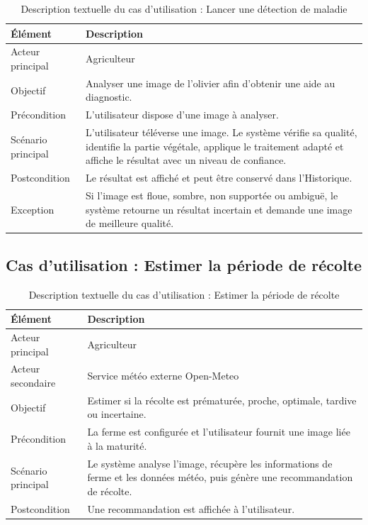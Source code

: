 \documentclass[12pt,a4paper]{report}
\begin{document}
\begin{table}[H]
\centering
\caption{Description textuelle du cas d'utilisation : Lancer une détection de maladie}
\label{tab:cu-detection-maladie}
\begin{tabular}{|p{4cm}|p{10cm}|}
\hline
\textbf{Élément} & \textbf{Description} \\
\hline
Acteur principal & Agriculteur \\
\hline
Objectif & Analyser une image de l'olivier afin d'obtenir une aide au diagnostic. \\
\hline
Précondition & L'utilisateur dispose d'une image à analyser. \\
\hline
Scénario principal & L'utilisateur téléverse une image. Le système vérifie sa qualité, identifie la partie végétale, applique le traitement adapté et affiche le résultat avec un niveau de confiance. \\
\hline
Postcondition & Le résultat est affiché et peut être conservé dans l'Historique. \\
\hline
Exception & Si l'image est floue, sombre, non supportée ou ambiguë, le système retourne un résultat incertain et demande une image de meilleure qualité. \\
\hline
\end{tabular}
\end{table}

\subsection{Cas d'utilisation : Estimer la période de récolte}

\begin{table}[H]
\centering
\caption{Description textuelle du cas d'utilisation : Estimer la période de récolte}
\label{tab:cu-recolte}
\begin{tabular}{|p{4cm}|p{10cm}|}
\hline
\textbf{Élément} & \textbf{Description} \\
\hline
Acteur principal & Agriculteur \\
\hline
Acteur secondaire & Service météo externe Open-Meteo \\
\hline
Objectif & Estimer si la récolte est prématurée, proche, optimale, tardive ou incertaine. \\
\hline
Précondition & La ferme est configurée et l'utilisateur fournit une image liée à la maturité. \\
\hline
Scénario principal & Le système analyse l'image, récupère les informations de ferme et les données météo, puis génère une recommandation de récolte. \\
\hline
Postcondition & Une recommandation est affichée à l'utilisateur. \\
\hline
\end{tabular}
\end{table}
\end{document}

